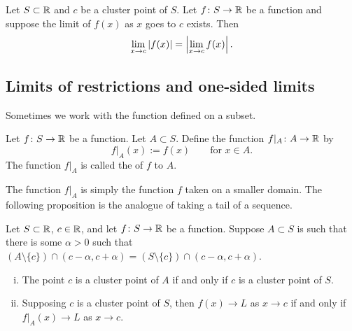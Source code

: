 \begin{cor} \label{fabs:cor}
Let $S \subset {\mathbb{R}}$ and $c$ be a cluster point of $S$.  Let $f \colon S \to
{\mathbb{R}}$ be a function and suppose the limit of $f(x)$ as $x$ goes to $c$ exists.
Then
\begin{equation*}
\lim_{x\to c} \left\lvert {f(x)} \right\rvert =
\left\lvert {\lim_{x\to c} f(x)} \right\rvert.
\end{equation*}
\end{cor}

\subsection{Limits of restrictions and one-sided limits}

Sometimes we work with the function defined on a subset.

\begin{defn}
Let $f \colon S \to {\mathbb{R}}$ be a function.  Let $A \subset S$.  Define the
function $f|_A \colon A \to {\mathbb{R}}$ by
\begin{equation*}
f|_A (x) := f(x)  \qquad \text{for $x \in A$}.
\end{equation*}
The function
$f|_A$ is called the \emph{} of $f$ to $A$.
\end{defn}

The function $f|_A$ is simply the function $f$ taken on a smaller domain.
The following proposition is the analogue of taking a tail of a sequence.

\begin{prop} \label{prop:limrest}
Let $S \subset {\mathbb{R}}$, $c \in {\mathbb{R}}$, and
let $f \colon S
\to {\mathbb{R}}$ be a function.
Suppose
$A \subset S$ is such that there is some $\alpha > 0$ such that
$(A \setminus \{ c \}) \cap (c-\alpha,c+\alpha) = (S \setminus \{ c \}) \cap (c-\alpha,c+\alpha)$.
\begin{enumerate}[(i)]
\item The point $c$ is a cluster point of $A$ if and only if $c$ is a cluster point
of $S$.
\item Supposing $c$ is a cluster point of $S$, then $f(x) \to L$ as $x \to c$ if and only if
$f|_A(x) \to L$ as $x \to c$.
\end{enumerate}
\end{prop}

